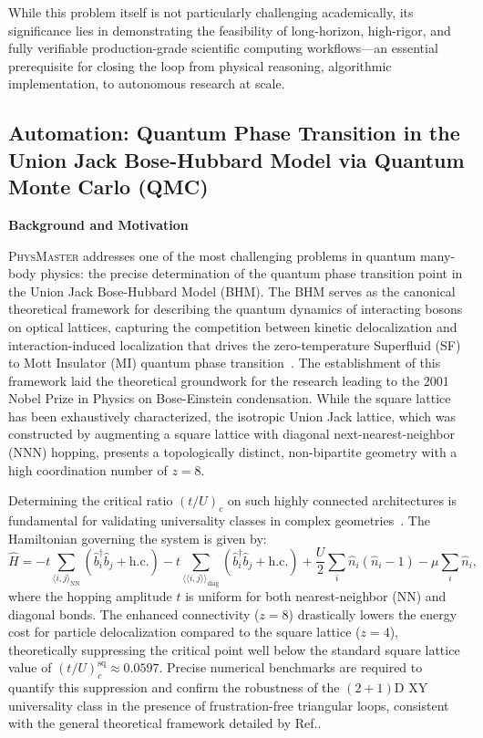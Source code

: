 \documentclass[11pt, a4paper, logo, copyright, nonumbering]{SAI}
\newcommand{\agent}{\textsc{PhysMaster}\xspace}
\newcommand{\op}[1]{\hat{#1}}
\newcommand{\dagop}[1]{\op{#1}^\dagger}
\begin{document}
While this problem itself is not particularly challenging academically, its significance lies in demonstrating the feasibility of long-horizon, high-rigor, and fully verifiable production-grade scientific computing workflows—an essential prerequisite for closing the loop from physical reasoning, algorithmic implementation, to autonomous research at scale.


\subsection{Automation: Quantum Phase Transition in the Union Jack Bose-Hubbard Model via Quantum Monte Carlo (QMC)}

\noindent \textbf{Background and Motivation}

\agent addresses one of the most challenging problems in quantum many-body physics: the precise determination of the quantum phase transition point in the Union Jack Bose-Hubbard Model (BHM). The BHM serves as the canonical theoretical framework for describing the quantum dynamics of interacting bosons on optical lattices, capturing the competition between kinetic delocalization and interaction-induced localization that drives the zero-temperature Superfluid (SF) to Mott Insulator (MI) quantum phase transition~\cite{fisher1989boson,greiner2002quantum}. The establishment of this framework laid the theoretical groundwork for the research leading to the 2001 Nobel Prize in Physics on Bose-Einstein condensation. While the square lattice has been exhaustively characterized, the isotropic Union Jack lattice, which was constructed by augmenting a square lattice with diagonal next-nearest-neighbor (NNN) hopping, presents a topologically distinct, non-bipartite geometry with a high coordination number of $z=8$.

Determining the critical ratio $(t/U)_c$ on such highly connected architectures is fundamental for validating universality classes in complex geometries~\cite{lkacki2016locating}. The Hamiltonian governing the system is given by:
\begin{equation}
\op{H} = -t \sum_{\langle i,j \rangle_{\text{NN}}} (\dagop{b}_i \op{b}_j + \text{h.c.}) - t \sum_{\langle\langle i,j \rangle\rangle_{\text{diag}}} (\dagop{b}_i \op{b}_j + \text{h.c.}) + \frac{U}{2} \sum_i \op{n}_i (\op{n}_i - 1) - \mu \sum_i \op{n}_i,
\end{equation}
where the hopping amplitude $t$ is uniform for both nearest-neighbor (NN) and diagonal bonds. The enhanced connectivity ($z=8$) drastically lowers the energy cost for particle delocalization compared to the square lattice ($z=4$), theoretically suppressing the critical point well below the standard square lattice value of $(t/U)_c^{\text{sq}} \approx 0.0597$. Precise numerical benchmarks are required to quantify this suppression and confirm the robustness of the $(2+1)$D XY universality class in the presence of frustration-free triangular loops, consistent with the general theoretical framework detailed by Ref.\cite{sachdev2011quantum}.
\end{document}
